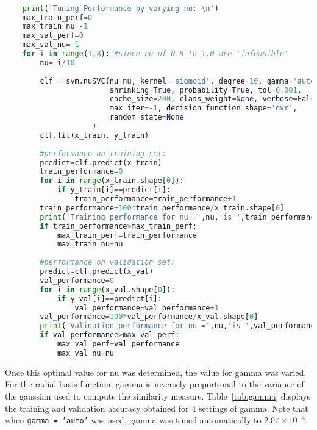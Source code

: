 \documentclass{article}
\begin{document}
\begin{lstlisting}[language=Python, caption=Optimizing the sklearn SVM implementation]

    print('Tuning Performance by varying nu: \n')
    max_train_perf=0
    max_train_nu=-1
    max_val_perf=0
    max_val_nu=-1
    for i in range(1,8): #since nu of 0.8 to 1.0 are 'infeasible'
        nu= i/10
        
        clf = svm.nuSVC(nu=nu, kernel='sigmoid', degree=10, gamma='auto', coef0=0.0, 
                        shrinking=True, probability=True, tol=0.001,
                        cache_size=200, class_weight=None, verbose=False,
                        max_iter=-1, decision_function_shape='ovr',
                        random_state=None
                    )
        clf.fit(x_train, y_train) 
        
        #performance on training set:
        predict=clf.predict(x_train)
        train_performance=0
        for i in range(x_train.shape[0]):
            if y_train[i]==predict[i]:
                train_performance=train_performance+1
        train_performance=100*train_performance/x_train.shape[0]
        print('Training performance for nu =',nu,'is ',train_performance)
        if train_performance>max_train_perf:
            max_train_perf=train_performance
            max_train_nu=nu
            
        #performance on validation set:
        predict=clf.predict(x_val)
        val_performance=0
        for i in range(x_val.shape[0]):
            if y_val[i]==predict[i]:
                val_performance=val_performance+1
        val_performance=100*val_performance/x_val.shape[0]
        print('Validation performance for nu =',nu,'is ',val_performance)
        if val_performance>max_val_perf:
            max_val_perf=val_performance
            max_val_nu=nu

\end{lstlisting}

Once this optimal value for nu was determined, the value for gamma was varied. For the radial basis function, gamma is inversely proportional to the variance of the gaussian used to compute the similarity measure. Table~\ref{tab:gamma} displays the training and validation accuracy obtained for 4 settings of gamma. Note that when \texttt{gamma = 'auto'} was used, gamma was tuned automatically to $2.07 \times 10^{-4}$.
\end{document}

